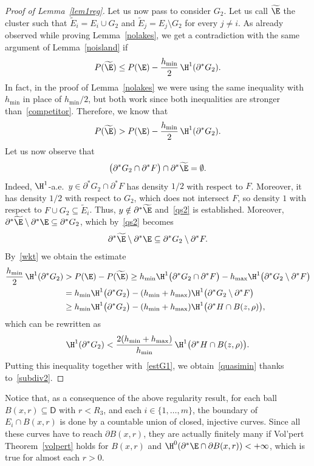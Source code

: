 \begin{proof}[Proof of Lemma~\ref{lem1reg}]
Let us now pass to consider $G_2$. Let us call $\widetilde \E$ the cluster such that $\widetilde E_i=E_i \cup G_2$ and $\widetilde E_j=E_j\setminus G_2$ for every $j\neq i$. As already observed while proving Lemma~\ref{nolakes}, we get a contradiction with the same argument of Lemma~\ref{noisland} if
\[
P(\widetilde\E) \leq P(\E) - \frac{h_{\min}}2\, \H^1(\partial^* G_2).
\]
In fact, in the proof of Lemma~\ref{nolakes} we were using the same inequality with $h_{\min}$ in place of $h_{\min}/2$, but both work since both inequalities are stronger than~\eqref{competitor}. Therefore, we know that
\begin{equation}\label{wkt}
P(\widetilde\E) > P(\E) -\frac{h_{\min}}2\, \H^1(\partial^* G_2).
\end{equation}
Let us now observe that
\begin{equation}\label{qs2}
\big(\partial^* G_2 \cap \partial^* F\big) \cap \partial^* \widetilde \E=\emptyset.
\end{equation}
Indeed, $\H^1$-a.e.\ $y\in \partial^* G_2\cap\partial^* F$ has density $1/2$ with respect to $F$. Moreover, it has density $1/2$ with respect to $G_2$, which does not intersect $F$, so density $1$ with respect to $F\cup G_2\subseteq \widetilde E_i$. Thus, $y\notin \partial^*\widetilde\E$ and~\eqref{qs2} is established. Moreover, $\partial^*\widetilde\E\setminus\partial^*\E\subseteq \partial^* G_2$, which by~\eqref{qs2} becomes
\[
\partial^*\widetilde\E\setminus\partial^*\E\subseteq \partial^* G_2\setminus \partial^*F.
\]
By~\eqref{wkt} we obtain the estimate
\[\begin{split}
\frac{h_{\min}}2\, \H^1(\partial^* G_2)&> P(\E)-P(\widetilde\E)
\geq h_{\min} \H^1\big(\partial^* G_2 \cap \partial^* F\big)-h_{\max} \H^1\big(\partial^* G_2 \setminus \partial^* F\big)\\
&=h_{\min} \H^1\big(\partial^* G_2\big)-(h_{\min}+h_{\max}) \H^1\big(\partial^* G_2 \setminus \partial^* F\big) \\
&\geq h_{\min} \H^1\big(\partial^* G_2\big)-(h_{\min}+h_{\max}) \H^1\big(\partial^* H \cap B(z,\rho)\big) ,
\end{split}\]
which can be rewritten as
\[
\H^1(\partial^* G_2)< \frac{2(h_{\min}+h_{\max})}{h_{\min}}\, \H^1\big(\partial^* H \cap B(z,\rho)\big).
\]
Putting this inequality together with~\eqref{estG1}, we obtain~\eqref{quasimin} thanks to~\eqref{subdiv2}.
\end{proof}

Notice that, as a consequence of the above regularity result, for each ball \hbox{$B(x,r)\!\subseteq\! \mathsf{D}$} with $r< R_3$, and each $i\in\{1,\dots,m\}$, the boundary of $E_i\cap B(x,r)$ is done by a countable union of closed, injective curves. Since all these curves have to reach $\partial B(x,r)$, they are actually finitely many if Vol'pert Theorem~\ref{volpert} holds for $B(x,r)$ and $\H^0(\partial^* \E \cap \partial B(x,r))<+\infty$, which is true for almost each $r>0$.

